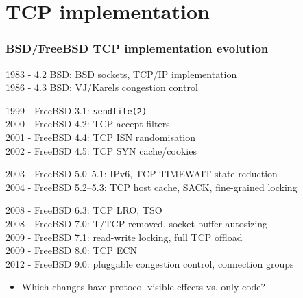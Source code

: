 \section{TCP implementation}

\begin{frame}
  \frametitle{BSD/FreeBSD TCP implementation evolution}

  \begin{small}
  1983 - 4.2 BSD: BSD sockets, TCP/IP implementation \\
  1986 - 4.3 BSD: VJ/Karels congestion control \\

  \pause
  \medskip

  1999 - FreeBSD 3.1: \texttt{sendfile(2)} \\
  2000 - FreeBSD 4.2: TCP accept filters \\
  2001 - FreeBSD 4.4: TCP ISN randomisation \\
  2002 - FreeBSD 4.5: TCP SYN cache/cookies \\

  \pause
  \medskip

  2003 - FreeBSD 5.0--5.1: IPv6, TCP TIMEWAIT state reduction \\
  2004 - FreeBSD 5.2--5.3: TCP host cache, SACK, fine-grained locking  \\

  \pause
  \medskip

  2008 - FreeBSD 6.3: TCP LRO, TSO \\
  2008 - FreeBSD 7.0: T/TCP removed, socket-buffer autosizing \\
  2009 - FreeBSD 7.1: read-write locking, full TCP offload \\
  2009 - FreeBSD 8.0: TCP ECN \\
  2012 - FreeBSD 9.0: pluggable congestion control, connection groups
  \end{small}

  \begin{itemize}
    \item Which changes have protocol-visible effects vs. only code?
  \end{itemize}
\end{frame}

